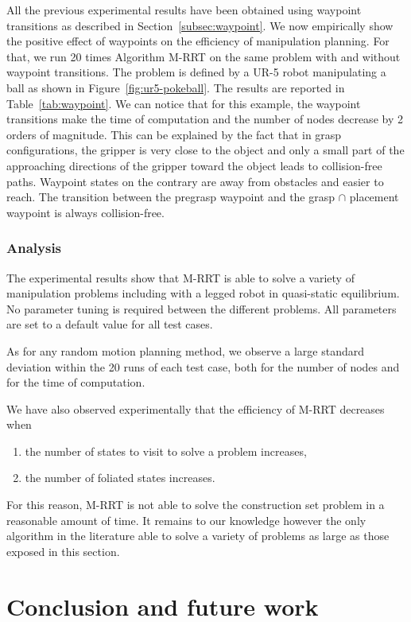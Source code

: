 All the previous experimental results have been obtained using
waypoint transitions as described in Section~\ref{subsec:waypoint}. We
now empirically show the positive effect of waypoints on the
efficiency of manipulation planning. For that, we run 20 times
Algorithm M-RRT on the same problem with and without waypoint
transitions.  The problem is defined by a UR-5 robot manipulating a
ball as shown in Figure~\ref{fig:ur5-pokeball}. The results are
reported in Table~\ref{tab:waypoint}. We can notice that for this
example, the waypoint transitions make the time of computation and the
number of nodes decrease by 2 orders of magnitude. This can be
explained by the fact that in grasp configurations, the gripper is
very close to the object and only a small part of the approaching
directions of the gripper toward the object leads to collision-free
paths. Waypoint states on the contrary are away from obstacles and
easier to reach. The transition between the pregrasp waypoint and the
grasp $\cap$ placement waypoint is always collision-free.

\subsubsection{Analysis}

The experimental results show that M-RRT is able to solve a variety of
manipulation problems including with a legged robot in quasi-static
equilibrium. No parameter tuning is required between the different problems. All
parameters are set to a default value for all test cases.

As for any random motion planning method, we observe a large standard
deviation within the 20 runs of each test case, both for the number of nodes
and for the time of computation.

We have also observed experimentally that the efficiency of M-RRT decreases
when
\begin{enumerate}
\item the number of states to visit to solve a problem increases,
\item the number of foliated states increases.
\end{enumerate}
For this reason, M-RRT is not able to solve the construction set
problem in a reasonable amount of time. It remains to our knowledge however
the only algorithm in the literature able to solve a variety of
problems as large as those exposed in this section.

\section{Conclusion and future work}

